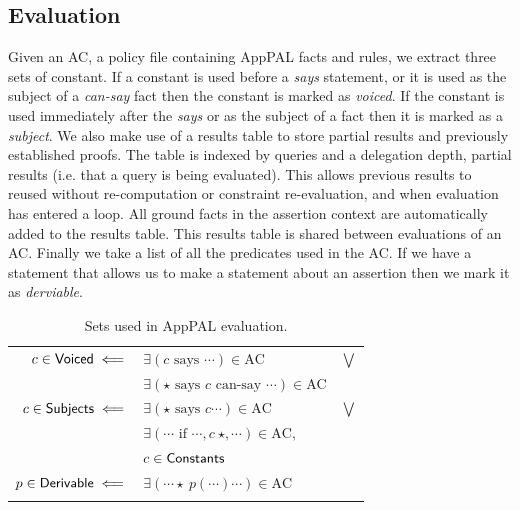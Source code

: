 \documentclass[thesis.tex]{subfiles}
\begin{document}
\subsection{Evaluation}
\label{ssec:evaluation-alg}


Given an \ac{AC}, a policy file containing AppPAL facts and rules, we extract three sets of constant.
If a constant is used before a \emph{says} statement, or it is used as the subject of a \emph{can-say} fact then the constant is marked as \emph{voiced}.
If the constant is used immediately after the \emph{says} or as the subject of a fact then it is marked as a \emph{subject}.
We also make use of a results table to store partial results and previously established proofs.
The table is indexed by queries and a delegation depth, partial results (i.e. that a query is being evaluated).
This allows previous results to reused without re-computation or constraint re-evaluation, and when evaluation has entered a loop.
All ground facts in the assertion context are automatically added to the results table.
This results table is shared between evaluations of an \ac{AC}.
Finally we take a list of all the predicates used in the \ac{AC}.
If we have a statement that allows us to make a statement about an assertion then we mark it as \emph{derviable}.

\begin{table}
  \centering
  \newcommand{\myset}[1]{\ensuremath{\text{\sffamily #1}}}
  \begin{tabular}{r l c}
    \toprule
    $c \in \myset{Voiced} \impliedby$     & $\exists \left(c \text{~says~} \cdots\right) \in \text{AC}$                        & $\bigvee$ \\
                                          & $\exists \left(\star \text{~says~} c \text{~can-say~} \cdots\right) \in \text{AC}$ &           \\
    $c \in \myset{Subjects} \impliedby$   & $\exists \left(\star \text{~says~} c\cdots\right) \in \text{AC}$                   & $\bigvee$ \\
                                          & $\exists \left(\cdots \text{~if~} \cdots,c~\star,\cdots\right) \in \text{AC},$     &           \\
                                          & $c \in \myset{Constants}$                                                          &           \\
    $p \in \myset{Derivable} \impliedby$  & $\exists \left( \cdots \star~p\left(\cdots\right) \cdots\right) \in \text{AC}$     &           \\
    \bottomrule                          \\
  \end{tabular}
  \caption{Sets used in AppPAL evaluation.}
  \label{tab:apppal-sets}
\end{table}
\end{document}
